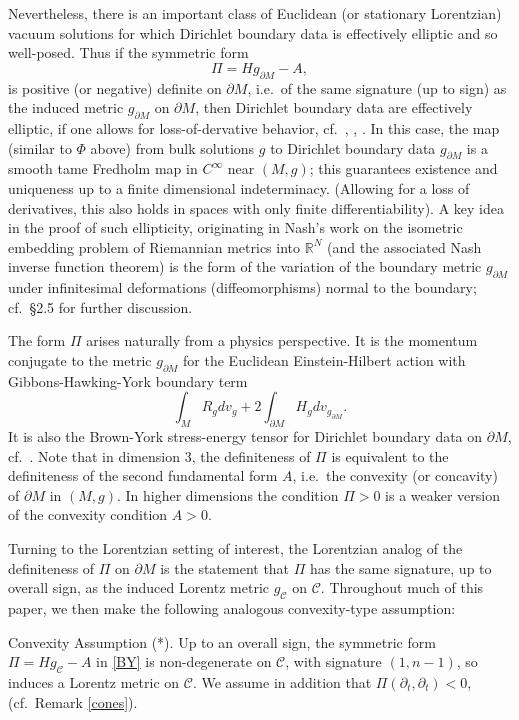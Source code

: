 \documentclass[10pt]{amsart}
\newcommand{\cC}{{\mathcal C}}
\newcommand{\bR}{\mathbb R}
\newcommand{\be}{\begin{equation}}
\newcommand{\ee}{\end{equation}}
\newcommand{\p}{\partial}
\newcommand{\<}{\langle}
\renewcommand{\>}{\rangle}
\newcommand{\dm}{{\partial M}}
\theoremstyle{plain}
\theoremstyle{remark}
\theoremstyle{definition}
\numberwithin{equation}{section}
\begin{document}
  Nevertheless, there is an important class of Euclidean (or stationary Lorentzian) vacuum solutions for which Dirichlet boundary data is effectively 
elliptic and so well-posed.  Thus if the symmetric form 
\be \label{BY}
\Pi = Hg_{\dm} - A,
\ee
is positive (or negative) definite on $\dm$, i.e.~of the same signature (up to sign) as the induced metric $g_{\dm}$ on $\dm$, then Dirichlet boundary 
data are effectively elliptic, if one allows for loss-of-dervative behavior, cf.~\cite{A1}, \cite{A2}, \cite{W}. In this case, the map (similar to $\Phi$ above) from bulk 
solutions $g$ to Dirichlet boundary data $g_{\dm}$ is a smooth tame Fredholm map in $C^{\infty}$ near $(M, g)$; this guarantees existence and uniqueness up to a finite 
dimensional indeterminacy. (Allowing for a loss of derivatives, this also holds in spaces with only finite differentiability). A key idea in the proof of such ellipticity, 
originating in Nash's work on the isometric embedding problem of Riemannian metrics into $\bR^N$ (and the associated Nash inverse function theorem) is the form 
of the variation of the boundary metric $g_{\dm}$ under infinitesimal deformations (diffeomorphisms) normal to the boundary; cf.~\S 2.5 for further discussion. 
 
   The form $\Pi$ arises naturally from a physics perspective. It is the momentum conjugate to the metric $g_{\dm}$ for the Euclidean Einstein-Hilbert 
action with Gibbons-Hawking-York boundary term
$$\int_M R_g dv_g + 2\int_{\dm}H_g dv_{g_{\dm}}.$$
It is also the Brown-York stress-energy tensor for Dirichlet boundary data on $\dm$, cf.~\cite{BY}. Note that in dimension 3, the definiteness of $\Pi$ is 
equivalent to the definiteness of the second fundamental form $A$, i.e.~the convexity (or concavity) of $\dm$ in $(M, g)$. In higher dimensions 
the condition $\Pi >0$ is a weaker version of the convexity condition $A > 0$. 

  Turning to the Lorentzian setting of interest, the Lorentzian analog of the definiteness of $\Pi$ on $\dm$ is the statement that $\Pi$ has 
the same signature, up to overall sign, as the induced Lorentz metric $g_{\cC}$ on $\cC$. Throughout much of this paper, we then 
make the following analogous convexity-type assumption: 

\smallskip

{\sf Convexity Assumption} {(*)}. Up to an overall sign, the symmetric form $\Pi = Hg_{\cC} - A$ in \eqref{BY} is non-degenerate on $\cC$, with signature $(1, n-1)$, 
so induces a Lorentz metric on $\cC$. We assume in addition that $\Pi(\p_t,\p_t) < 0$, (cf.~Remark \ref{cones}). 
\end{document}
